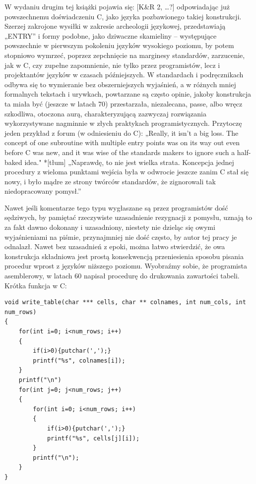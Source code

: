 W wydaniu drugim tej książki pojawia się: [K\&R 2, …?]
odpowiadając już powszechnemu doświadczeniu C, jako języka pozbawionego takiej konstrukcji.
Szerzej zakrojone wysiłki w zakresie archeologii językowej, przedstawiają „ENTRY” i formy podobne, jako dziwaczne skamieliny – występujące powszechnie w pierwszym pokoleniu języków wysokiego poziomu, by potem stopniowo wymrzeć, poprzez zepchnięcie na marginesy standardów, zarzucenie, jak w C, czy zupełne zapomnienie, nie tylko przez programistów, lecz i projektantów języków w czasach późniejszych. W standardach i podręcznikach odbywa się to wymieranie bez obszerniejszych wyjaśnień, a w różnych mniej formalnych tekstach i urywkach, powtarzane są często opinie, jakoby konstrukcja ta miała być (jeszcze w latach 70) przestarzała, niezalecana,  passe, albo wręcz szkodliwa, otoczona aurą, charakteryzującą zazwyczaj rozwiązania wykorzystywane nagminnie w złych praktykach programistycznych. Przytoczę jeden przykład z forum (w odniesieniu do C):
„Really, it isn't a big loss. The concept of one subroutine with
multiple entry points was on its way out even before C was new, and it
was wise of the standards makers to ignore such a half-baked idea."
*[tłum]
„Naprawdę, to nie jest wielka strata. Koncepcja jednej procedury z wieloma punktami wejścia była w odwrocie jeszcze zanim C stał się nowy, i było mądre ze strony twórców standardów, że zignorowali tak niedopracowany pomysł.” 
 
Nawet jeśli komentarze tego typu wygłaszane są przez programistów dość sędziwych, by pamiętać rzeczywiste uzasadnienie rezygnacji z pomysłu, uznają to za fakt dawno dokonany i uzasadniony, niestety nie dzieląc się owymi wyjaśnieniami na piśmie, przynajmniej nie dość często, by autor tej pracy je odnalazł.
Nawet bez uzasadnień z epoki, można łatwo stwierdzić, że owa konstrukcja składniowa jest prostą konsekwencją przeniesienia sposobu pisania procedur wprost z języków niższego poziomu. Wyobraźmy sobie, że programista asemblerowy, w latach 60 napisał procedurę do drukowania zawartości tabeli. Krótka funkcja w C:

\begin{lstlisting}
void write_table(char *** cells, char ** colnames, int num_cols, int num_rows)
{
    for(int i=0; i<num_rows; i++)
    {
        if(i>0){putchar(',');}
        printf("%s", colnames[i]);
    }
    printf("\n")
    for(int j=0; j<num_rows; j++)
    {
        for(int i=0; i<num_rows; i++)
        {
            if(i>0){putchar(',');}
            printf("%s", cells[j][i]);
        }
        printf("\n");
    }
}
\end{lstlisting}

